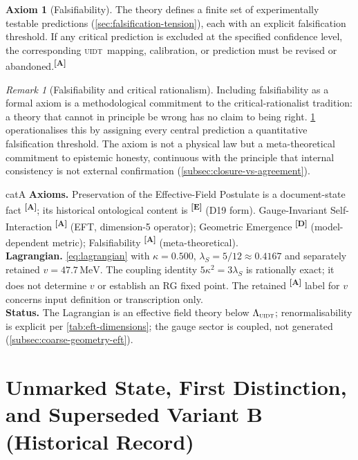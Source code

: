 \documentclass[12pt,a4paper,twoside]{article}
\theoremstyle{plain}
\theoremstyle{definition}
\newtheorem{axiom}{Axiom}
\theoremstyle{remark}
\newtheorem{remark}[theorem]{Remark}
\newcommand{\UIDT}{\textsc{uidt}} %
\newcommand{\MeV}{\,\mathrm{MeV}}
\newcommand{\catmark}[1]{\textsuperscript{\textsf{\textbf{[#1]}}}}
\newcommand{\lambdaS}{5/12 \approx 0.4167} %
\newcommand{\kappaVal}{0.500} %
\newcommand{\vVEV}{47.7\MeV} %
\begin{document}
\begin{axiom}[Falsifiability]
\label{ax:falsifiability}
The theory defines a finite set of experimentally testable predictions
(\cref{sec:falsification-tension}), each with an explicit falsification
threshold. If any critical prediction is excluded at the specified
confidence level, the corresponding \UIDT\ mapping, calibration, or
prediction must be revised or abandoned.\catmark{A}
\end{axiom}

\begin{remark}[Falsifiability and critical rationalism]
\label{rem:popper}
Including falsifiability as a formal axiom is a methodological
commitment to the critical-rationalist tradition: a theory that cannot
in principle be wrong has no claim to being right.
\cref{ax:falsifiability} operationalises this by assigning every central
prediction a quantitative falsification threshold. The axiom is not a
physical law but a meta-theoretical commitment to epistemic honesty,
continuous with the principle that internal consistency is not external
confirmation (\cref{subsec:closure-vs-agreement}).
\end{remark}

\begin{evidencebox}{catA}
\textbf{Axioms.} Preservation of the Effective-Field Postulate is a
document-state fact \catmark{A}; its historical ontological content is
\catmark{E} (D19 form). Gauge-Invariant Self-Interaction \catmark{A} (EFT, dimension-5
operator); Geometric Emergence \catmark{D} (model-dependent metric);
Falsifiability \catmark{A} (meta-theoretical).\\[0.3em]
\textbf{Lagrangian.} \cref{eq:lagrangian} with $\kappa=\kappaVal$,
$\lambda_S=\lambdaS$ and separately retained $v=\vVEV$.
The coupling identity $5\kappa^2=3\lambda_S$ is rationally exact;
it does not determine $v$ or establish an RG fixed point. The retained
\catmark{A} label for $v$ concerns input definition or transcription only.\\[0.3em]
\textbf{Status.} The Lagrangian is an effective field theory below
$\Lambda_{\UIDT}$; renormalisability is explicit per
\cref{tab:eft-dimensions}; the gauge sector is coupled, not generated
(\cref{subsec:coarse-geometry-eft}).
\end{evidencebox}

\section{Unmarked State, First Distinction, and Superseded Variant B (Historical Record)}
\label{sec:unmarked-distinction-sx}
\end{document}
